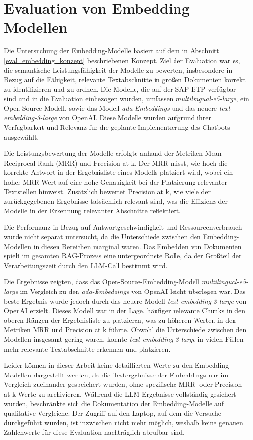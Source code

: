 \section{Evaluation von Embedding Modellen}
\label{eval_embedding}

Die Untersuchung der Embedding-Modelle basiert auf dem in Abschnitt \ref{eval_embedding_konzept} beschriebenen Konzept. Ziel der Evaluation war es, die semantische Leistungsfähigkeit der Modelle zu bewerten, 
insbesondere in Bezug auf die Fähigkeit, relevante Textabschnitte in großen Dokumenten korrekt zu identifizieren und zu ordnen. 
Die Modelle, die auf der SAP \ac{BTP} verfügbar sind und in die Evaluation einbezogen wurden, umfassen \textit{multilingual-e5-large}, ein Open-Source-Modell, 
sowie das Modell \textit{ada-Embeddings} und das neuere \textit{text-embedding-3-large} von OpenAI. Diese Modelle wurden aufgrund ihrer Verfügbarkeit und Relevanz für die geplante Implementierung des Chatbots ausgewählt.

Die Leistungsbewertung der Modelle erfolgte anhand der Metriken Mean Reciprocal Rank (\ac{MRR}) und Precision at k. Der \ac{MRR} misst, wie hoch die korrekte Antwort in der Ergebnisliste eines Modells platziert wird, 
wobei ein hoher \ac{MRR}-Wert auf eine hohe Genauigkeit bei der Platzierung relevanter Textstellen hinweist. Zusätzlich bewertet Precision at k, wie viele der zurückgegebenen Ergebnisse tatsächlich relevant sind, 
was die Effizienz der Modelle in der Erkennung relevanter Abschnitte reflektiert.

Die Performanz in Bezug auf Antwortgeschwindigkeit und Ressourcenverbrauch wurde nicht separat untersucht, da die Unterschiede zwischen den Embedding-Modellen in diesen Bereichen marginal waren. 
Das Embedden von Dokumenten spielt im gesamten \ac{RAG}-Prozess eine untergeordnete Rolle, da der Großteil der Verarbeitungszeit durch den \ac{LLM}-Call bestimmt wird.

Die Ergebnisse zeigten, dass das Open-Source-Embedding-Modell \textit{multilingual-e5-large} im Vergleich zu den \textit{ada-Embeddings} von OpenAI leicht überlegen war. 
Das beste Ergebnis wurde jedoch durch das neuere Modell \textit{text-embedding-3-large} von OpenAI erzielt. Dieses Modell war in der Lage, häufiger relevante Chunks in den oberen Rängen der Ergebnisliste zu platzieren, 
was zu höheren Werten in den Metriken \ac{MRR} und Precision at k führte. Obwohl die Unterschiede zwischen den Modellen insgesamt gering waren, 
konnte \textit{text-embedding-3-large} in vielen Fällen mehr relevante Textabschnitte erkennen und platzieren.

Leider können in dieser Arbeit keine detaillierten Werte zu den Embedding-Modellen dargestellt werden, da die Testergebnisse der Embeddings nur im Vergleich zueinander gespeichert wurden, 
ohne spezifische \ac{MRR}- oder Precision at k-Werte zu archivieren. Während die \ac{LLM}-Ergebnisse vollständig gesichert wurden, 
beschränkte sich die Dokumentation der Embedding-Modelle auf qualitative Vergleiche. Der Zugriff auf den Laptop, auf dem die Versuche durchgeführt wurden, 
ist inzwischen nicht mehr möglich, weshalb keine genauen Zahlenwerte für diese Evaluation nachträglich abrufbar sind.
